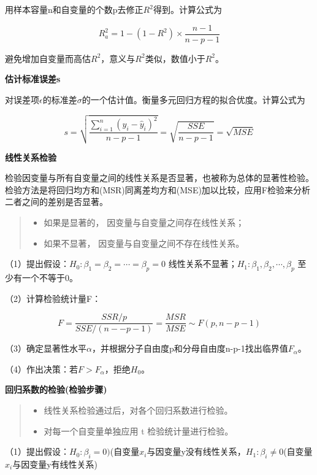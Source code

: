 \documentclass[]{ctexbook}
\providecommand{\tightlist}{%
  \setlength{\itemsep}{0pt}\setlength{\parskip}{0pt}}
\begin{document}
用样本容量n和自变量的个数p去修正\(R^2\)得到。计算公式为

\[R_a^2=1-(1-R^2)\times\frac{n-1}{n-p-1}\]

避免增加自变量而高估\(R^2\)，意义与\(R^2\)类似，数值小于\(R^2\)。

\textbf{估计标准误差s}

对误差项\(\epsilon\)的标准差\(\sigma\)的一个估计值。衡量多元回归方程的拟合优度。计算公式为

\[s=\sqrt{\frac{\sum_{i=1}^n(y_i-\hat y_i)^2}{n-p-1}}=\sqrt{\frac{SSE}{n-p-1}}=\sqrt{MSE}\]

\textbf{线性关系检验}

检验因变量与所有自变量之间的线性关系是否显著，也被称为总体的显著性检验。检验方法是将回归均方和(MSR)同离差均方和(MSE)加以比较，应用F检验来分析二者之间的差别是否显著。

\begin{quote}
\begin{itemize}
\tightlist
\item
  如果是显著的， 因变量与自变量之间存在线性关系；
\item
  如果不显著， 因变量与自变量之间不存在线性关系。
\end{itemize}
\end{quote}

（1）提出假设：\(H_0:\beta_1=\beta_2=\cdots=\beta_p=0\) 线性关系不显著；\(H_1:\beta_1,\beta_2,\cdots,\beta_p\) 至少有一个不等于0。

（2）计算检验统计量F：

\[F=\frac{SSR/p}{SSE/(n--p-1)}=\frac{MSR}{MSE}\sim F(p,n-p-1)\]

（3）确定显著性水平\(\alpha\)，并根据分子自由度p和分母自由度n-p-1找出临界值\(F_\alpha\)。

（4）作出决策：若\(F>F_\alpha\)，拒绝\(H_0\)。

\textbf{回归系数的检验(检验步骤)}

\begin{quote}
\begin{itemize}
\tightlist
\item
  线性关系检验通过后，对各个回归系数进行检验。
\item
  对每一个自变量单独应用 t 检验统计量进行检验。
\end{itemize}
\end{quote}

（1）提出假设：\(H_0:\beta_i=0)\)(自变量\(x_i\)与因变量y没有线性关系，\(H_1:\beta_i\neq 0\)(自变量\(x_i\)与因变量y有线性关系)
\end{document}
